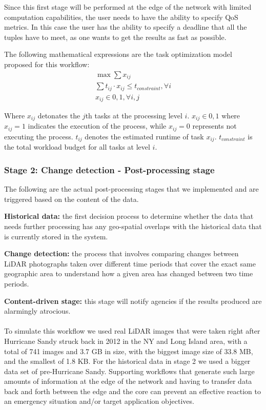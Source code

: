 Since this first stage will be performed at the edge of the network with limited computation capabilities, the user needs to have the ability to specify QoS metrics. In this case the user has the ability to specify a deadline that all the tuples have to meet, as one wants to get the results as fast as possible. 

The following mathematical expressions are the task optimization model proposed for this workflow:
\begin{equation}
\begin{split}
\max \sum x_{ij}
\\
\sum t_{ij} \cdot x_{ij} \leq t_{constraint} , \forall i
\\
x_{ij} \in {0,1}, \forall i,j
\end{split}
\end{equation}

\noindent Where $x_{ij}$ detonates the $j$th tasks at the processing level $i$. $x_{ij} \in {0,1}$ where $x_{ij} = 1$ indicates the execution of the process, while $x_{ij} = 0$ represents not executing the process. $t_{ij}$ denotes the estimated runtime of task $x_{ij}$. $t_{constraint}$ is the total workload budget for all tasks at level $i$.

\subsubsection{Stage 2: Change detection - Post-processing stage}
The following are the actual post-processing stages that we implemented and are triggered based on the content of the data.

\noindent\textbf{Historical data:} the first decision process to determine whether the data that needs further processing has any geo-spatial overlaps with the historical data that is currently stored in the system.

\noindent\textbf{Change detection:} the process that involves comparing changes between LiDAR photographs taken over different time periods that cover the exact same geographic area to understand how a given area has changed between two time periods. 

\noindent\textbf{Content-driven stage:} this stage will notify agencies if the results produced are alarmingly atrocious. 
\\
\\
\noindent To simulate this workflow we used real LiDAR images that were taken right after Hurricane Sandy struck back in 2012 in the NY and Long Island area, with a total of 741 images and 3.7 GB in size, with the biggest image size of 33.8 MB, and the smallest of 1.8 KB. For the historical data in stage 2 we used a bigger data set of pre-Hurricane Sandy. Supporting workflows that generate such large amounts of information at the edge of the network and having to transfer data back and forth between the edge and the core can prevent an effective reaction to an emergency situation and/or target application objectives.

